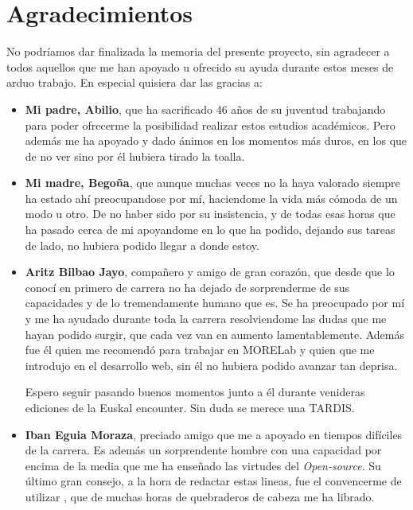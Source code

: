 \chapter*{Agradecimientos}

No podríamos dar finalizada la memoria del presente proyecto, sin agradecer a todos aquellos que me han apoyado u ofrecido su ayuda durante estos meses de arduo trabajo.
En especial quisiera dar las gracias a: 

\begin{itemize}
	\item \textbf{Mi padre, Abilio}, que ha sacrificado 46 años de su juventud trabajando para poder ofrecerme la posibilidad realizar estos estudios académicos. Pero además me ha apoyado y dado ánimos en los momentos más duros, en los que de no ver sino por él hubiera tirado la toalla.

	\item \textbf{Mi madre, Begoña}, que aunque muchas veces no la haya valorado siempre ha estado ahí preocupandose por mí, haciendome la vida más cómoda de un modo u otro. De no haber sido por su insistencia, y de todas esas horas que ha pasado cerca de mi apoyandome en lo que ha podido, dejando sus tareas de lado, no hubiera podido llegar a donde estoy.

	\item \textbf{Aritz Bilbao Jayo}, compañero y amigo de gran corazón, que desde que lo conocí en primero de carrera no ha dejado de sorprenderme de sus capacidades y de lo tremendamente humano que es. Se ha preocupado por mí y me ha ayudado durante toda la carrera resolviendome las dudas que me hayan podido surgir, que cada vez van en aumento lamentablemente. 
	Además fue él quien me recomendó para trabajar en MORELab y quien que me introdujo en el desarrollo web, sin él no hubiera podido avanzar tan deprisa.
	
	Espero seguir pasando buenos momentos junto a él durante venideras ediciones de la Euskal encounter. Sin duda se merece una TARDIS.

	\item \textbf{Iban Eguia Moraza}, preciado amigo que me a apoyado en tiempos difíciles de la carrera. Es además un sorprendente hombre con una capacidad por encima de la media que me ha enseñado las virtudes del \textit{Open-source}. Su último gran consejo, a la hora de redactar estas lineas, fue el convencerme de utilizar , que de muchas horas de quebraderos de cabeza me ha librado.
	

\end{itemize}
